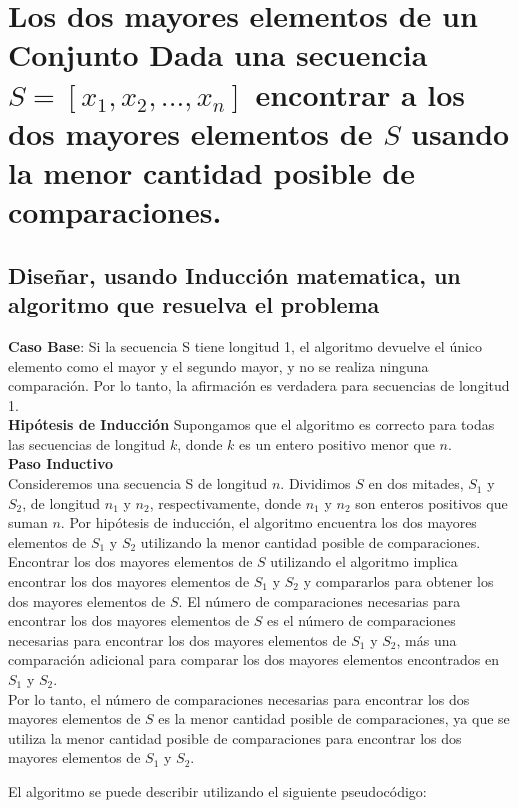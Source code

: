 \section{Los dos mayores elementos de un Conjunto
Dada una secuencia $S= [x_1, x_2, . . . , x_n]$ encontrar a los dos mayores elementos de $S$ usando la menor cantidad posible de comparaciones.}

\subsection{Diseñar, usando Inducción matematica, un algoritmo que resuelva el problema}

\textbf{Caso Base}:  Si la secuencia S tiene longitud 1, el algoritmo devuelve el único elemento como el mayor y el segundo mayor, y no se realiza ninguna comparación. Por lo tanto, la afirmación es verdadera para secuencias de longitud 1.\\
\textbf{Hipótesis de Inducción} Supongamos que el algoritmo es correcto para todas las secuencias de longitud $k$, donde $k$ es un entero positivo menor que $n$.\\
\textbf{Paso Inductivo}\\
Consideremos una secuencia S de longitud $n$. Dividimos $S$ en dos mitades, $S_1$ y $S_2$, de longitud $n_1$ y $n_2$, respectivamente, donde $n_1$ y $n_2$ son enteros positivos que suman $n$. Por hipótesis de inducción, el algoritmo encuentra los dos mayores elementos de $S_1$ y $S_2$ utilizando la menor cantidad posible de comparaciones.\\

Encontrar los dos mayores elementos de $S$ utilizando el algoritmo implica encontrar los dos mayores elementos de $S_1$ y $S_2$ y compararlos para obtener los dos mayores elementos de $S$. El número de comparaciones necesarias para encontrar los dos mayores elementos de $S$ es el número de comparaciones necesarias para encontrar los dos mayores elementos de $S_1$ y $S_2$, más una comparación adicional para comparar los dos mayores elementos encontrados en $S_1$ y $S_2$.\\

Por lo tanto, el número de comparaciones necesarias para encontrar los dos mayores elementos de $S$ es la menor cantidad posible de comparaciones, ya que se utiliza la menor cantidad posible de comparaciones para encontrar los dos mayores elementos de $S_1$ y $S_2$.

El algoritmo se puede describir utilizando el siguiente pseudocódigo:

